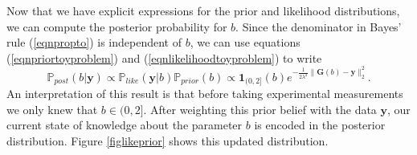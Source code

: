 \documentclass[12pt]{book}
\newcommand{\post}{\mathbb{P}_{post}}
\newcommand{\like}{\mathbb{P}_{like}}
\newcommand{\prior}{\mathbb{P}_{prior}}
\newcommand{\y}{\textbf{y}}
\begin{document}
Now that we have explicit expressions for the prior and likelihood distributions, we
can compute the posterior probability for $b$.
Since
the denominator in Bayes' rule (\ref{eqnpropto}) is independent of $b$, 
we can use equations (\ref{eqnpriortoyproblem}) and (\ref{eqnlikelihoodtoyproblem})  
to write 
\begin{equation}\label{eqnposteriorforb}
\post(b|\y)\propto\like(\y|b)\prior(b)\propto \textbf{1}_{(0,2]}(b)e^{-\frac{1}{2\lambda^{2}}\|\textbf{G}(b)-\textbf{y}\|_{2}^{2}}.
\end{equation}
An interpretation of this result is that before taking experimental measurements  we only knew 
that $b\in (0,2]$. After weighting this prior belief with the data $\y$, our current state of knowledge about the
parameter $b$ is encoded in the posterior distribution. Figure \ref{figlikeprior} shows this updated distribution.
%
%
\end{document}
